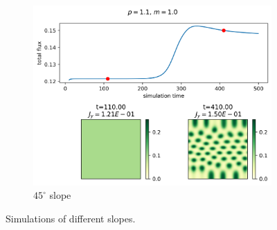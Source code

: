 \documentclass{article}
\numberwithin{equation}{section}
\begin{document}
\begin{figure}[ht!]
\begin{subfigure}{.4\linewidth}
        \includegraphics[scale=0.45]{plots/p1_1_m1_0.png}
        \caption{$45^\circ$ slope}
        \label{fig:slope_45}
    \end{subfigure}
    \caption{Simulations of different slopes.}
    \label{fig:flux_out_slopes}
\end{figure}
\end{document}
